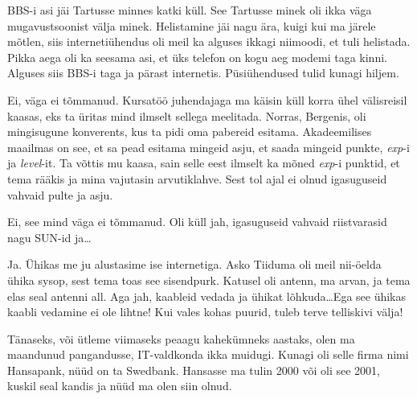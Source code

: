                  
BBS-i asi jäi Tartusse minnes katki küll. See Tartusse minek oli ikka väga 
mugavustsoonist välja minek. Helistamine jäi nagu ära, kuigi kui ma järele 
mõtlen, siis internetiühendus oli meil ka alguses ikkagi niimoodi, et tuli 
helistada. Pikka aega oli ka seesama asi, et üks telefon on kogu aeg modemi 
taga kinni. Alguses siis BBS-i taga ja pärast internetis. Püsiühendused tulid 
kunagi hiljem.
                 

Ei, väga ei tõmmanud. Kursatöö juhendajaga ma käisin küll korra ühel 
välisreisil kaasas, eks ta üritas mind ilmselt sellega meelitada. Norras, 
Bergenis, oli mingisugune konverents, kus ta pidi oma pabereid esitama. 
Akadeemilises maailmas on see, et sa pead esitama mingeid asju, et saada 
mingeid punkte, \emph{exp}-i ja \emph{level}-it. Ta võttis mu kaasa, sain selle 
eest ilmselt ka mõned \emph{exp}-i punktid, et tema rääkis ja mina vajutasin 
arvutiklahve. Sest tol ajal ei olnud igasuguseid vahvaid pulte ja asju. 


Ei, see mind väga ei tõmmanud. Oli küll jah, igasuguseid vahvaid riistvarasid 
nagu SUN-id ja\ldots 

                 
Ja. Ühikas me ju alustasime ise internetiga. Asko 
Tiiduma oli meil nii-öelda ühika sysop, sest tema 
toas see sisendpurk. Katusel oli antenn, ma arvan, ja tema  elas seal antenni 
all. Aga jah, kaableid vedada ja ühikat lõhkuda\ldots Ega see ühikas kaabli 
vedamine ei ole lihtne! Kui vales kohas puurid, tuleb terve telliskivi välja!


Tänaseks, või ütleme viimaseks peaagu kahekümneks aastaks, olen ma maandunud  
pangandusse,  IT-valdkonda ikka muidugi. Kunagi oli selle firma nimi Hansapank, 
nüüd on ta Swedbank. Hansasse ma tulin 2000 või oli see 2001, kuskil seal 
kandis ja nüüd ma olen siin olnud.


